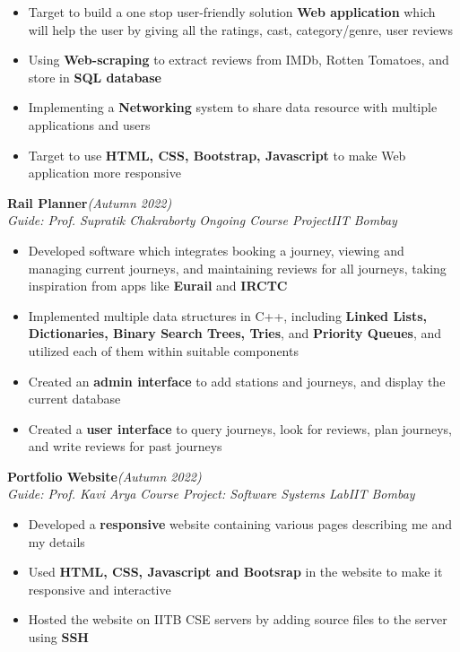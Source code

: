 \documentclass[10 pt]{article}
\begin{document}
		\begin{itemize}[itemsep = -0.8 mm, leftmargin=*]
		\vspace{-16pt}
		\item Target to build a one stop user-friendly solution \textbf{Web application} which will help the user by giving all the ratings, cast, category/genre, user reviews
		\item Using \textbf{Web-scraping} to extract reviews from IMDb, Rotten Tomatoes, and store in \textbf{SQL database}
		\item Implementing a \textbf{Networking} system to share data resource with multiple applications and users
		\item  Target to use \textbf{HTML, CSS, Bootstrap, Javascript} to make Web application more responsive
	\end{itemize}
{\selectfont
		\textbf{{Rail Planner}}\hfill{\sl \small (Autumn 2022)}\\
	}{\it Guide: Prof. Supratik Chakraborty \textbar} {\it Ongoing Course Project}\hfill{\sl \small IIT Bombay}\\
	\begin{itemize}[itemsep = -0.8 mm, leftmargin=*]
		\vspace{-16pt}
		\item Developed software which integrates booking a journey, viewing and managing current journeys, and maintaining reviews for all journeys, taking inspiration from apps like \textbf{Eurail} and \textbf{IRCTC}
		\item Implemented multiple data structures in C++, including \textbf{Linked Lists, Dictionaries, Binary Search Trees, Tries}, and \textbf{Priority Queues}, and utilized each of them within suitable components
		\item Created an \textbf{admin interface} to add stations and journeys, and display the current database
		\item Created a \textbf{user interface} to query journeys, look for reviews, plan journeys, and write reviews for past journeys
	\end{itemize}
{\selectfont
		\textbf{{Portfolio Website}}\hfill{\sl \small (Autumn 2022)}\\
	}{\it Guide: Prof. Kavi Arya \textbar} {\it Course Project: Software Systems Lab}\hfill{\sl \small IIT Bombay}\\
	\begin{itemize}[itemsep = -0.8 mm, leftmargin=*]
		\vspace{-16pt}
		\item Developed  a \textbf{responsive} website containing various pages describing me and my details
		\item Used \textbf{HTML, CSS, Javascript and Bootsrap} in the website to make it responsive and interactive
		\item Hosted the website on IITB CSE servers by adding source files to the server using \textbf{SSH}
	\end{itemize}
\end{document}
